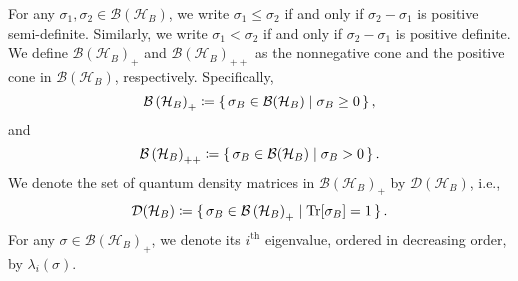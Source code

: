 \documentclass{article}
\begin{document}
For any \( \sigma_1, \sigma_2 \in \mathcal{B}(\mathcal{H}_B) \), we write \( \sigma_1 \leq \sigma_2 \) if and only if \( \sigma_2 - \sigma_1 \) is positive semi-definite. Similarly, we write \( \sigma_1 < \sigma_2 \) if and only if \( \sigma_2 - \sigma_1 \) is positive definite.
We define $\mathcal{B}\left(\mathcal{H}_B\right)_{+}$ and $\mathcal{B}\left( \mathcal{H}_B\right)_{++}$ as the nonnegative cone and the positive cone in \( \mathcal{B}(\mathcal{H}_B) \), respectively. 
Specifically,
\begin{equation} 
\mathcal{B}\left(\mathcal{H}_B\right)_{+} \coloneqq \set{ \sigma_B \in \mathcal{B}(\mathcal{H}_B) | \sigma_B \geq 0},
\end{equation} 
and
\begin{equation} 
\mathcal{B}\left(\mathcal{H}_B\right)_{++} \coloneqq \set{ \sigma_B \in \mathcal{B}(\mathcal{H}_B) | \sigma_B > 0}.
\end{equation}
We denote the set of quantum density matrices in $\mathcal{B}\left(\mathcal{H}_B\right)_{+}$ by $\mathcal{D}(\mathcal{H}_B)$, i.e.,
\begin{equation} \label{eq:set_B}
\mathcal{D}(\mathcal{H}_B) \coloneqq \set{ \sigma_B \in \mathcal{B}\left(\mathcal{H}_B\right)_{+} | \operatorname{Tr}[\sigma_B] = 1}.
\end{equation} 
For any $\sigma\in\mathcal{B}\left(\mathcal{H}_B\right)_{+}$, we denote its $i^{\text{th}}$ eigenvalue, ordered in decreasing order, by $\lambda_i(\sigma)$. 


\end{document}
